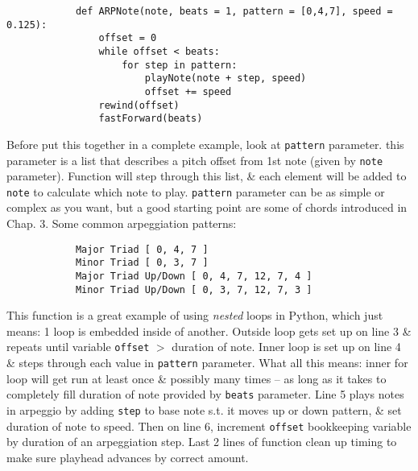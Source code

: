 \documentclass{article}
\begin{document}
\begin{itemize}
\begin{itemize}
		\begin{verbatim}
			def ARPNote(note, beats = 1, pattern = [0,4,7], speed = 0.125):
			    offset = 0
			    while offset < beats:
			        for step in pattern:
			            playNote(note + step, speed)
			            offset += speed
			    rewind(offset)
			    fastForward(beats)
		\end{verbatim}
		Before put this together in a complete example, look at {\tt pattern} parameter. this parameter is a list that describes a pitch offset from 1st note (given by {\tt note} parameter). Function will step through this list, \& each element will be added to {\tt note} to calculate which note to play. {\tt pattern} parameter can be as simple or complex as you want, but a good starting point are some of chords introduced in Chap. 3. Some common arpeggiation patterns:
		\begin{verbatim}
			Major Triad [ 0, 4, 7 ]
			Minor Triad [ 0, 3, 7 ]
			Major Triad Up/Down [ 0, 4, 7, 12, 7, 4 ]
			Minor Triad Up/Down [ 0, 3, 7, 12, 7, 3 ]
		\end{verbatim}
		This function is a great example of using {\it nested} loops in Python, which just means: 1 loop is embedded inside of another. Outside loop gets set up on line 3 \& repeats until variable {\tt offset} $>$ duration of note. Inner loop is set up on line 4 \& steps through each value in {\tt pattern} parameter. What all this means: inner for loop will get run at least once \& possibly many times -- as long as it takes to completely fill duration of note provided by {\tt beats} parameter. Line 5 plays notes in arpeggio by adding {\tt step} to base note s.t. it moves up or down pattern, \& set duration of note to speed. Then on line 6, increment {\tt offset} bookkeeping variable by duration of an arpeggiation step. Last 2 lines of function clean up timing to make sure playhead advances by correct amount.
		

\end{itemize}
\end{itemize}
\end{document}
